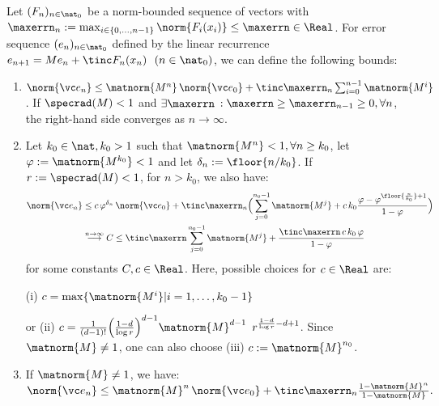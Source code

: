 \begin{thm}\label{thm:normboundsboundeddisturbmainbody}
Let $(F_n)_{n \in \nat_0}$ be a norm-bounded sequence of vectors with $\maxerrn_n :=\max_{i \in \{0,\ldots,n-1\}} \norm{F_i(x_i)} \leq \maxerrn \in \Real$. 
For error sequence $(e_n)_{n \in \nat_0}$ defined by the linear recurrence 
	$e_{n+1}  = M e_n + \tinc F_n(x_n) \,\,\,\, (n \in \nat_0)$, we can define the following bounds:
	
	\begin{enumerate}
	\item $\norm{\vc e_n} \leq \matnorm{M^{n}} \, \norm{\vc e_0} + \tinc \maxerrn_{n} \sum_{i=0}^{n-1}  \matnorm{M^{i}}$. If $\specrad(M) <1$ and $\exists \maxerrn$ $:\maxerrn\geq \maxerrn_{n-1} \geq 0, \forall n$, the right-hand side converges as $n \to \infty$.
	\item Let $k_0 \in \nat, k_0 >1$ such that $\matnorm{M^n} <1, \forall n \geq k_0$, let $\varphi := \matnorm{M^{k_0}} <1$ and let $\delta_n := \floor{n/k_0}$. If $r:=\specrad(M) < 1$, for $n > k_0$,  we also have:
	\begin{align*} \norm{\vc e_n} &\leq c \, \varphi^{\delta_n} \, \norm{\vc e_0} + \tinc \maxerrn_{n} \Bigl(\sum_{j=0}^{n_0-1} \matnorm{M^j} + c \, k_0 \frac{\varphi-\varphi^{ \floor{\frac{n}{k_0}}+1 }}{1-\varphi} \Bigr)\\
	& \stackrel{n \to \infty}{\longrightarrow} C \leq \tinc \maxerrn \sum_{j=0}^{n_0-1} \matnorm{M^j} 
	+ \frac{\tinc \maxerrn\,  c\, k_0 \,\varphi}{1-\varphi} 
	\end{align*} 
	for some constants $C,c \in \Real$.
	Here, possible choices for $c \in \Real$ are: 
	
(i) $c= \max\{\matnorm{M^i} | i=1,\ldots,k_0-1 \}$ 

or (ii) $c = \frac{1}{(d-1)!} \Bigl(\frac{1 - d}{\log r}\Bigr)^{d-1}	\matnorm{M}^{d-1}\, \, \, r^{\frac{1 - d}{\log r}-d+1}  $.
%
Since $\matnorm{M} \neq 1$, one can also choose (iii) $c:= \matnorm{M}^{n_0}$. %

\item If $\matnorm{M} \neq 1$, we have: \newline
$\norm{\vc e_n} \leq \matnorm{M}^{n} \, \norm{\vc e_0} + \tinc \maxerrn_{n}   \frac{1-\matnorm{M}^n}{1-\matnorm{M}}. $
	\end{enumerate}
%
\end{thm}


